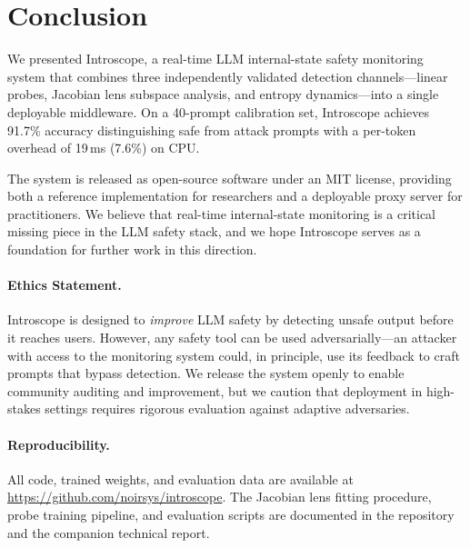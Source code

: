 \documentclass[11pt,twocolumn]{article}
\begin{document}
\section{Conclusion}

\label{sec:conclusion}

We presented Introscope, a real-time LLM internal-state safety monitoring system that combines three independently validated detection channels---linear probes, Jacobian lens subspace analysis, and entropy dynamics---into a single deployable middleware. On a 40-prompt calibration set, Introscope achieves 91.7\% accuracy distinguishing safe from attack prompts with a per-token overhead of 19\,ms (7.6\%) on CPU.

The system is released as open-source software under an MIT license, providing both a reference implementation for researchers and a deployable proxy server for practitioners. We believe that real-time internal-state monitoring is a critical missing piece in the LLM safety stack, and we hope Introscope serves as a foundation for further work in this direction.

\paragraph{Ethics Statement.} Introscope is designed to \emph{improve} LLM safety by detecting unsafe output before it reaches users. However, any safety tool can be used adversarially---an attacker with access to the monitoring system could, in principle, use its feedback to craft prompts that bypass detection. We release the system openly to enable community auditing and improvement, but we caution that deployment in high-stakes settings requires rigorous evaluation against adaptive adversaries.

\paragraph{Reproducibility.} All code, trained weights, and evaluation data are available at \url{https://github.com/noirsys/introscope}. The Jacobian lens fitting procedure, probe training pipeline, and evaluation scripts are documented in the repository and the companion technical report.
\end{document}
